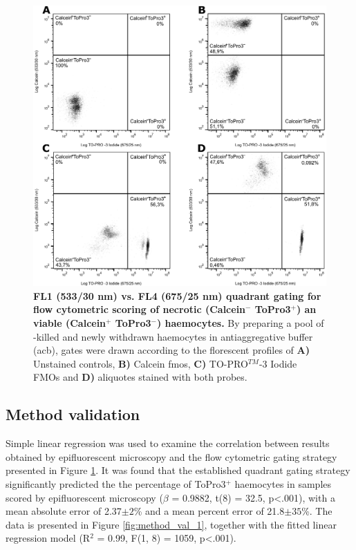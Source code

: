 \begin{figure}[ht!]
    \centering
    \includegraphics[width=.7\textwidth]{figures/Gating strategy/ToPro3 CAM gating strategy.pdf}
    \caption{\textbf{FL1 (533/30 nm) vs. FL4 (675/25 nm) quadrant gating for flow cytometric scoring of necrotic (Calcein$^{-}$ ToPro3$^{+}$) an viable (Calcein$^{+}$ ToPro3$^{-}$) haemocytes.} By preparing a pool of -killed and newly withdrawn haemocytes in antiaggregative buffer (\acrshort{acb}), gates were drawn according to the florescent profiles of \textbf{A)} Unstained controls, \textbf{B)} Calcein \acrshort{fmo}s, \textbf{C)} TO-PRO$^{TM}$-3 Iodide FMOs and \textbf{D)} aliquotes stained with both probes.}
    \label{fig:TP3_Calcein_gating_strat}
\end{figure}


\subsection{Method validation}
Simple linear regression was used to examine the correlation between results obtained by epifluorescent microscopy and the flow cytometric gating strategy presented in Figure \ref{fig:TP3_Calcein_gating_strat}. It was found that the established quadrant gating strategy significantly predicted the the percentage of ToPro3$^{+}$ haemocytes in samples scored by epifluorescent microscopy ($\beta$ = 0.9882, t(8) = 32.5, p<.001), with a mean absolute error of 2.37$\pm{2}$\% and a mean percent error of 21.8$\pm{35}$\%. The data is presented in Figure \ref{fig:method_val_1}, together with the fitted linear regression model (R$^{2}$ = 0.99, F(1, 8) = 1059, p<.001).

